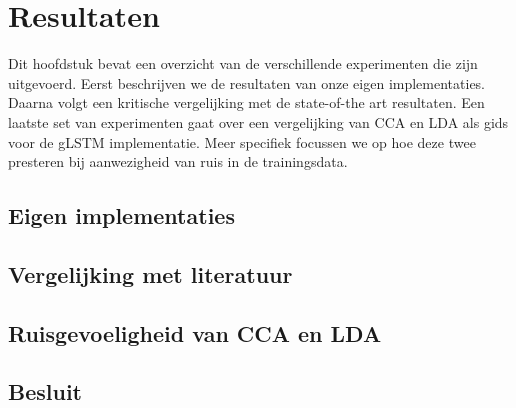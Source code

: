 \chapter{Resultaten} %
\label{cha:resultaten}
Dit hoofdstuk bevat een overzicht van de verschillende experimenten die zijn uitgevoerd. Eerst beschrijven we de resultaten van onze eigen implementaties. Daarna volgt een kritische vergelijking met de state-of-the art resultaten. Een laatste set van experimenten gaat over een vergelijking van CCA en LDA als gids voor de gLSTM implementatie. Meer specifiek focussen we op hoe deze twee presteren bij aanwezigheid van ruis in de trainingsdata.

\section{Eigen implementaties} %
\label{sec:eigen_implementaties}


\section{Vergelijking met literatuur} %
\label{sec:vergelijking_met_literatuur}


\section{Ruisgevoeligheid van CCA en LDA} %
\label{sec:ruisgevoeligheid_van_cca_en_lda}


\section{Besluit} %
\label{sec:besluit}


